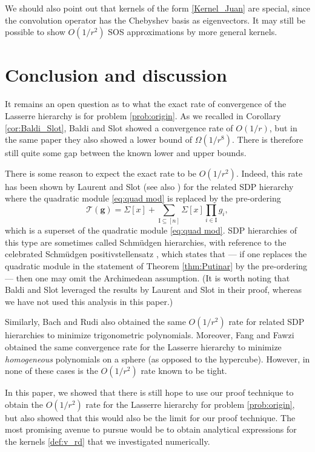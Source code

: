 \documentclass[11pt]{article}
\theoremstyle{definition}
\begin{document}
We should also point out that kernels of the form \eqref{Kernel_Juan} are special, since the convolution operator has the Chebyshev basis as eigenvectors. It may still be possible to show $O(1/r^2)$ SOS approximations by more general kernels.


\section{Conclusion and discussion}
\label{sec:conclusion}
It remains an open question as to what the exact rate of convergence of the Lasserre hierarchy is for problem \eqref{prob:origin}.
As we recalled in Corollary \ref{cor:Baldi_Slot}, Baldi and Slot \cite{doi:10.1137/23M1555430} showed a convergence rate of $O(1/r)$, but in the same
paper they also showed a lower bound of $\Omega(1/r^8)$.
There is therefore still quite some gap between the known lower and upper bounds.

There is some reason to expect the exact rate to be $O(1/r^2)$. Indeed, this rate has been shown by Laurent and Slot \cite{Laurent2021AnEV} (see also \cite{De_Klerk_Vera_2024}) for the related SDP
hierarchy where the quadratic module \eqref{eq:quad mod}  is replaced by the pre-ordering
\[
\mathcal{T}(\mathbf{g}) = \Sigma[x] + \sum_{\mathrm{I} \subseteq [n]} \Sigma[x] \prod_{i \in \mathrm{I}}g_i,
\]
which is a superset of the quadratic module \eqref{eq:quad mod}. SDP hierarchies of this type are sometimes called Schm\"{u}dgen hierarchies,
with reference to the celebrated Schm\"{u}dgen positivstellensatz \cite{Schmudgen1991}, which states that --- if one replaces the quadratic module in the statement of
Theorem \ref{thm:Putinar} by the pre-ordering --- then one may omit the Archimedean assumption. (It is worth noting that Baldi and Slot \cite{doi:10.1137/23M1555430} leveraged the results by Laurent and Slot \cite{Laurent2021AnEV} in their proof, whereas we have not used this analysis in this paper.)


Similarly, Bach and Rudi \cite{doi:10.1137/22M1540818} also obtained the same $O(1/r^2)$ rate for related SDP hierarchies to minimize trigonometric polynomials.
Moreover, Fang and Fawzi \cite{10.1007/s10107-020-01537-7} obtained the same convergence rate for the Lasserre hierarchy
{to minimize {\em homogeneous} polynomials} on a sphere (as opposed to the hypercube).
However, in none of these cases is the $O(1/r^2)$ rate known to be tight.

In this paper, we showed that there is still hope to use our proof technique to obtain the $O(1/r^2)$ rate for the
Lasserre hierarchy for problem \eqref{prob:origin}, but also showed that this would also be the limit for our proof technique. The most promising avenue to pursue would be
to obtain analytical expressions for the kernels \eqref{def:v_rd} that we investigated numerically.
\end{document}
